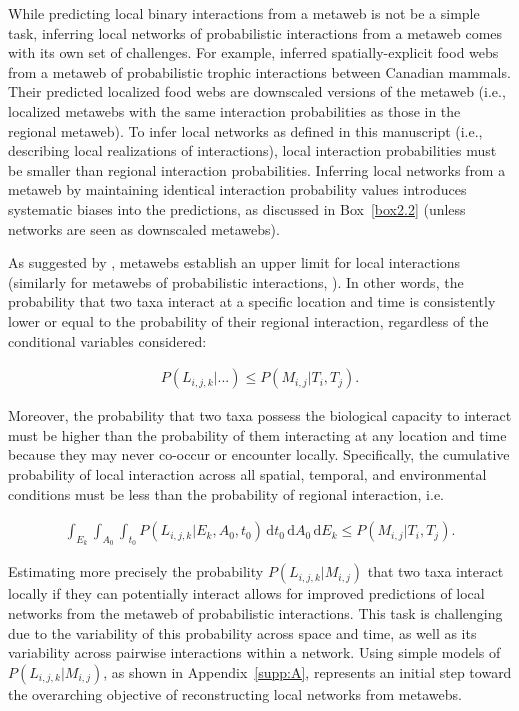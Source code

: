 While predicting local binary interactions from a metaweb is not be a simple
task, inferring local networks of probabilistic interactions from a metaweb
comes with its own set of challenges. For example, \textcite{Dansereau2024Spatially}
inferred spatially-explicit food webs from a metaweb of probabilistic trophic
interactions between Canadian mammals. Their predicted localized food webs are
downscaled versions of the metaweb (i.e., localized metawebs with the same
interaction probabilities as those in the regional metaweb). To infer local
networks as defined in this manuscript (i.e., describing local realizations of
interactions), local interaction probabilities must be smaller than regional
interaction probabilities. Inferring local networks from a metaweb by
maintaining identical interaction probability values introduces systematic
biases into the predictions, as discussed in Box~\ref{box2.2} (unless networks are seen as
downscaled metawebs).

As suggested by \textcite{McLeod2021Sampling}, metawebs establish an upper limit for
local interactions (similarly for metawebs of probabilistic interactions,
\cite{Strydom2023Grapha}). In other words, the probability that two taxa interact
at a specific location and time is consistently lower or equal to the
probability of their regional interaction, regardless of the conditional
variables considered:

\begin{eqnarray}
  \label{eq:switch}
  P(L_{i, j, k} | ...) \le P(M_{i, j} | T_i, T_j).
\end{eqnarray}

Moreover, the probability that two taxa possess the biological capacity to
interact must be higher than the probability of them interacting at any location
and time because they may never co-occur or encounter locally. Specifically, the
cumulative probability of local interaction across all spatial, temporal, and
environmental conditions must be less than the probability of regional
interaction, i.e.

\begin{eqnarray}
  \label{eq:all}
  \int_{E_k}\int_{A_0}\int_{t_0} P(L_{i, j, k} | E_k, A_0, t_0) \, \text{d}t_0
\, \text{d}A_0 \,\text{d}E_k \leq P(M_{i, j} | T_i, T_j).
\end{eqnarray}

Estimating more precisely the probability $P(L_{i, j, k}|M_{i, j})$ that two
taxa interact locally if they can potentially interact allows for improved
predictions of local networks from the metaweb of probabilistic interactions.
This task is challenging due to the variability of this probability across space
and time, as well as its variability across pairwise interactions within a
network. Using simple models of $P(L_{i, j, k}|M_{i, j})$, as shown in
Appendix~\ref{supp:A}, represents an initial step toward the overarching
objective of reconstructing local networks from metawebs.

